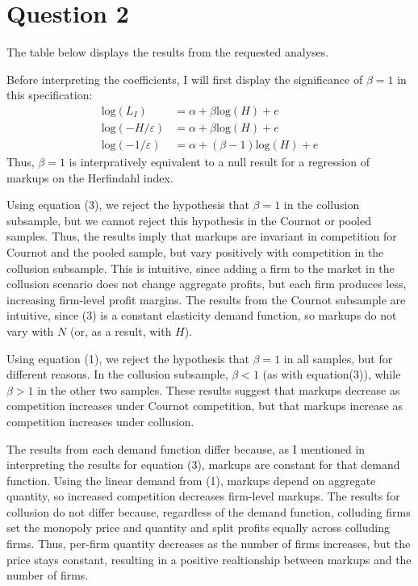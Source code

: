 \documentclass{article}
\newcommand{\loge}[1]{\text{log}\left(#1\right)}
\begin{document}
\section*{Question 2}
The table below displays the results from the requested analyses.
\begin{center}
  
\end{center}
Before interpreting the coefficients, I will first display the significance of ${\beta=1}$ in this specification:\begin{align*} 
  \loge{L_I} &= \alpha + \beta\loge{H} + e \\
  \loge{-H/\varepsilon} &= \alpha + \beta\loge{H} + e \\
  \loge{-1/\varepsilon} &= \alpha + (\beta-1)\loge{H} + e 
\end{align*}
Thus, ${\beta=1}$ is interpratively equivalent to a null result for a regression of markups on the Herfindahl index.

Using equation (3), we reject the hypothesis that ${\beta=1}$ in the collusion subsample, but we cannot reject this hypothesis in the Cournot or pooled samples. Thus, the results imply that markups are invariant in competition for Cournot and the pooled sample, but vary positively with competition in the collusion subsample. This is intuitive, since adding a firm to the market in the collusion scenario does not change aggregate profits, but each firm produces less, increasing firm-level profit margins. The results from the Cournot subsample are intuitive, since (3) is a constant elasticity demand function, so markups do not vary with $N$ (or, as a result, with $H$).

Using equation (1), we reject the hypothesis that ${\beta=1}$ in all samples, but for different reasons. In the collusion subsample, ${\beta<1}$ (as with equation(3)), while ${\beta>1}$ in the other two samples. These results suggest that markups decrease as competition increases under Cournot competition, but that markups increase as competition increases under collusion.

The results from each demand function differ because, as I mentioned in interpreting the results for equation (3), markups are constant for that demand function. Using the linear demand from (1), markups depend on aggregate quantity, so increased competition decreases firm-level markups. The results for collusion do not differ because, regardless of the demand function, colluding firms set the monopoly price and quantity and split profits equally across colluding firms. Thus, per-firm quantity decreases as the number of firms increases, but the price stays constant, resulting in a positive realtionship between markups and the number of firms.
\end{document}
